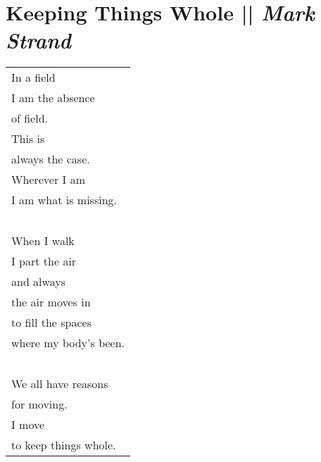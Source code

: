 \section[Keeping Things Whole]{Keeping Things Whole || \emph{Mark Strand} \hspace*{\fill}  \thepage}
\vfill
\begin{center}
\begin{tabular}{l}
In a field\\
I am the absence\\
of field.\\
This is\\
always the case.\\
Wherever I am\\
I am what is missing.\\
\-\ \\When I walk\\
I part the air\\
and always\\
the air moves in\\
to fill the spaces\\
where my body’s been.\\
\-\ \\We all have reasons\\
for moving.\\
I move\\
to keep things whole.
\end{tabular}
\end{center}
\vfill